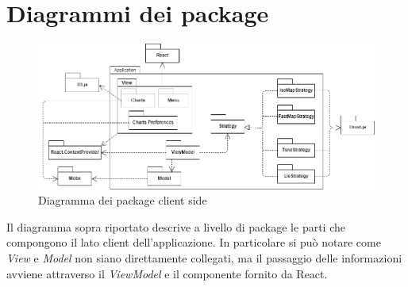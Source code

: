 \section{Diagrammi dei package}
\begin{figure}[hb]
\includegraphics[width=15.8cm]{Images/Allegato Tecnico-Package}
\centering
\caption{Diagramma dei package client side}
\end{figure}

Il diagramma sopra riportato descrive a livello di package le parti che compongono il lato client dell'applicazione. In particolare si può notare come \textit{View} e \textit{Model} non siano direttamente collegati, ma il passaggio delle informazioni avviene attraverso il \textit{ViewModel} e il componente  fornito da React. \\ %

